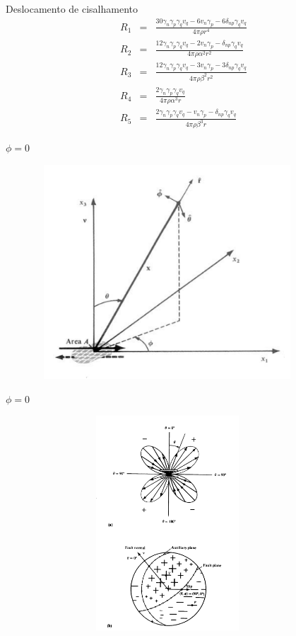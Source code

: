 \documentclass{beamer}
\newcommand{\g}{\gamma}
\begin{document}
\begin{frame}{Deslocamento de cisalhamento}
	\begin{eqnarray}
	R_1 &=& \frac{30\g_n\g_p\g_qv_q-6v_n\g_p-6\delta_{np}\g_qv_q}{4\pi\rho r^4} \nonumber \\
	R_2 &=& \frac{12\g_n\g_p\g_qv_q-2v_n\g_p-\delta_{np}\g_qv_q}{4\pi\rho\alpha^2 r^2} \nonumber \\
	R_3 &=& \frac{12\g_n\g_p\g_qv_q-3v_n\g_p-3\delta_{np}\g_qv_q}{4\pi\rho\beta^2 r^2} \nonumber \\
	R_4 &=& \frac{2\g_n\g_p\g_qv_q}{4\pi\rho\alpha^3r} \nonumber \\
	R_5 &=& \frac{2\g_n\g_p\g_qv_q-v_n\g_p-\delta_{np}\g_qv_q}{4\pi\rho\beta^3 r} \nonumber 
	\end{eqnarray}
\end{frame}

\begin{frame}{$\phi = 0$}
	\begin{figure}[htb]
		\centering
		\includegraphics[width= 10cm, height= 8cm]{fig44}
	\end{figure}
\end{frame}

\begin{frame}{$\phi = 0$}
	\begin{figure}[htb]
		\centering
		\includegraphics[width= 10cm, height= 8cm]{fig45}
	\end{figure}
\end{frame}
\end{document}
